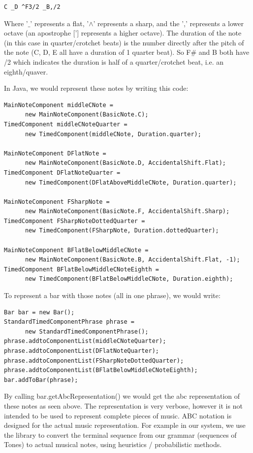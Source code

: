\documentclass[pdftex,12pt,a4paper]{report}
\begin{document}
\begin{verbatim}
C _D ^F3/2 _B,/2
\end{verbatim}

Where '$\_$' represents a flat, '$\wedge$' represents a sharp, and the ',' represents a lower octave (an apostrophe ['] represents a higher octave). The duration of the note (in this case in quarter/crotchet beats) is the number directly after the pitch of the note (C, D, E all have a duration of 1 quarter beat). So F\# and B both have /2 which indicates the duration is half of a quarter/crotchet beat, i.e. an eighth/quaver.

In Java, we would represent these notes by writing this code:

\begin{lstlisting}
MainNoteComponent middleCNote = 
      new MainNoteComponent(BasicNote.C);
TimedComponent middleCNoteQuarter = 
      new TimedComponent(middleCNote, Duration.quarter);

MainNoteComponent DFlatNote = 
      new MainNoteComponent(BasicNote.D, AccidentalShift.Flat);
TimedComponent DFlatNoteQuarter = 
      new TimedComponent(DFlatAboveMiddleCNote, Duration.quarter);

MainNoteComponent FSharpNote = 
      new MainNoteComponent(BasicNote.F, AccidentalShift.Sharp);
TimedComponent FSharpNoteDottedQuarter = 
      new TimedComponent(FSharpNote, Duration.dottedQuarter);

MainNoteComponent BFlatBelowMiddleCNote = 
      new MainNoteComponent(BasicNote.B, AccidentalShift.Flat, -1);
TimedComponent BFlatBelowMiddleCNoteEighth = 
      new TimedComponent(BFlatBelowMiddleCNote, Duration.eighth);

\end{lstlisting}

To represent a bar with those notes (all in one phrase), we would write:

\begin{lstlisting}
Bar bar = new Bar();
StandardTimedComponentPhrase phrase = 
      new StandardTimedComponentPhrase();
phrase.addtoComponentList(middleCNoteQuarter);
phrase.addtoComponentList(DFlatNoteQuarter);
phrase.addtoComponentList(FSharpNoteDottedQuarter);
phrase.addtoComponentList(BFlatBelowMiddleCNoteEighth);
bar.addToBar(phrase);

\end{lstlisting}

By calling bar.getAbcRepresentation() we would get the abc representation of these notes as seen above. The representation is very verbose, however it is not intended to be used to represent complete pieces of music. ABC notation is designed for the actual music representation. For example in our system, we use the library to convert the terminal sequence from our grammar (sequences of Tones) to actual musical notes, using heuristics / probabilistic methods. 
\end{document}
